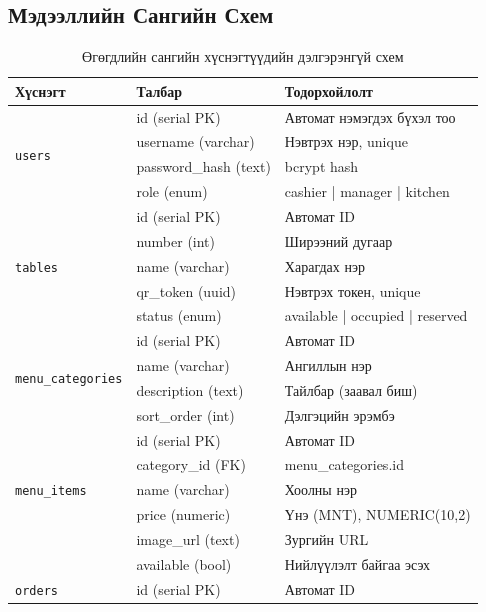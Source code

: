 \documentclass[12pt,a4paper]{article}
\begin{document}
\subsection{Мэдээллийн Сангийн Схем}

\begin{table}[H]
\caption{Өгөгдлийн сангийн хүснэгтүүдийн дэлгэрэнгүй схем}
\label{tab:schema}
\centering
\begin{tabularx}{\textwidth}{@{}p{2.4cm}p{2.4cm}p{4.8cm}@{}}
\toprule
\textbf{Хүснэгт} & \textbf{Талбар} & \textbf{Тодорхойлолт} \\
\midrule
\multirow{4}{*}{\texttt{users}}
  & id (serial PK)          & Автомат нэмэгдэх бүхэл тоо \\
  & username (varchar)      & Нэвтрэх нэр, unique \\
  & password\_hash (text)   & bcrypt hash \\
  & role (enum)             & cashier | manager | kitchen \\
\midrule
\multirow{5}{*}{\texttt{tables}}
  & id (serial PK)          & Автомат ID \\
  & number (int)            & Ширээний дугаар \\
  & name (varchar)          & Харагдах нэр \\
  & qr\_token (uuid)        & Нэвтрэх токен, unique \\
  & status (enum)           & available | occupied | reserved \\
\midrule
\multirow{4}{*}{\texttt{menu\_categories}}
  & id (serial PK)          & Автомат ID \\
  & name (varchar)          & Ангиллын нэр \\
  & description (text)      & Тайлбар (заавал биш) \\
  & sort\_order (int)       & Дэлгэцийн эрэмбэ \\
\midrule
\multirow{5}{*}{\texttt{menu\_items}}
  & id (serial PK)          & Автомат ID \\
  & category\_id (FK)       & menu\_categories.id \\
  & name (varchar)          & Хоолны нэр \\
  & price (numeric)         & Үнэ (MNT), NUMERIC(10,2) \\
  & image\_url (text)       & Зургийн URL \\
  & available (bool)        & Нийлүүлэлт байгаа эсэх \\
\midrule
\multirow{4}{*}{\texttt{orders}}
  & id (serial PK)          & Автомат ID \\

\end{tabularx}
\end{table}
\end{document}
